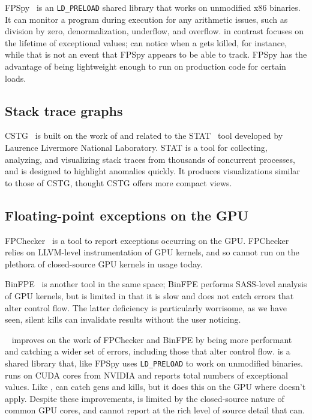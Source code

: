 \documentclass{juliacon}
\begin{document}
FPSpy~\cite{dindaSpyingFloatingPoint2020} is an \texttt{LD\_PRELOAD} shared library that works on unmodified x86 binaries.
It can monitor a program during execution for any \fp{} arithmetic issues, such as division by zero, denormalization, underflow, and overflow.
\FT{} in contrast focuses on the lifetime of exceptional values; \FT{} can notice when a \NaN{} gets killed, for instance, while that is not an event that FPSpy appears to be able to track.
FPSpy has the advantage of being lightweight enough to run on production code for certain loads.

\subsection{Stack trace graphs}

CSTG~\cite{humphreySystematicDebuggingMethods2014} is built on the work of and related to the STAT~\cite{arnoldStackTraceAnalysis2007} tool developed by Laurence Livermore National Laboratory.
STAT is a tool for collecting, analyzing, and visualizing stack traces from thousands of concurrent processes, and is designed to highlight anomalies quickly.
It produces visualizations similar to those of CSTG, thought CSTG offers more compact views.

\subsection{Floating-point exceptions on the GPU}

FPChecker~\cite{l-ase-2019} is a tool to report \fp{} exceptions occurring on the GPU.
FPChecker relies on LLVM-level instrumentation of GPU kernels, and so cannot run on the plethora of closed-source GPU kernels in usage today.

BinFPE~\cite{llg-soap-2022} is another tool in the same space;
BinFPE performs SASS-level analysis of GPU kernels, but is limited in that it is slow and does not catch errors that alter control flow.
The latter deficiency is particularly worrisome, as we have seen, silent \NaN{} kills can invalidate results without the user noticing.

\GPUFPX{}~\cite{llsflg-hpdc-2023} improves on the work of FPChecker and BinFPE by being more performant and catching a wider set of errors, including those that alter control flow.
\GPUFPX{} is a shared library that, like FPSpy uses \texttt{LD\_PRELOAD} to work on unmodified binaries.
\GPUFPX{} runs on CUDA cores from NVIDIA and reports total numbers of exceptional values.
Like \FT{}, \GPUFPX{} can catch \NaN{} gens and kills, but it does this on the GPU where \FT{} doesn't apply.
Despite these improvements, \GPUFPX{} is limited by the closed-source nature of common GPU cores, and cannot report at the rich level of source detail that \FT{} can.
\end{document}
